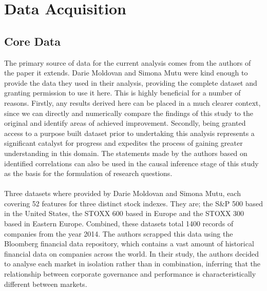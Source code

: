 \section{Data Acquisition}
\subsection{Core Data}
{The primary source of data for the current analysis comes from the authors of the paper it extends. Darie Moldovan and Simona Mutu were kind enough to provide the data they used in their analysis, providing the complete dataset and granting permission to use it here. This is highly beneficial for a number of reasons. Firstly, any results derived here can be placed in a much clearer context, since we can directly and numerically compare the findings of this study to the original and identify areas of achieved improvement. Secondly, being granted access to a purpose built dataset prior to undertaking this analysis represents a significant catalyst for progress and expedites the process of gaining greater understanding in this domain. The statements made by the authors based on identified correlations can also be used in the causal inference stage of this study as the basis for the formulation of research questions.}\\\\
{Three datasets where provided by Darie Moldovan and Simona Mutu, each covering 52 features for three distinct stock indexes. They are; the S\&P 500 based in the United States, the STOXX 600 based in Europe and the STOXX 300 based in Eastern Europe. Combined, these datasets total 1400 records of companies from the year 2014. The authors scrapped this data using the Bloomberg financial data repository, which contains a vast amount of historical financial data on companies across the world. In their study, the authors decided to analyse each market in isolation rather than in combination, inferring that the relationship between corporate governance and performance is characteristically different between markets.   }
